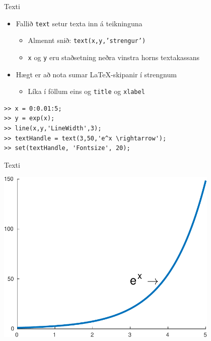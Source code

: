 \documentclass[handout]{beamer}
\begin{document}
\begin{frame}[fragile]{Texti}
\begin{itemize}
 \item Fallið \texttt{text} setur texta inn á teikninguna
 \begin{itemize}
  \item Almennt snið: \texttt{text(x,y,'strengur')}
  \item \texttt{x} og \texttt{y} eru staðsetning neðra vinstra horns textakassans
 \end{itemize}
 \item Hægt er að nota sumar \LaTeX-skipanir í strengnum
 \begin{itemize}
  \item Líka í föllum eins og \texttt{title} og \texttt{xlabel}
 \end{itemize}
\end{itemize}

\begin{verbatim}
>> x = 0:0.01:5;
>> y = exp(x);
>> line(x,y,'LineWidth',3);
>> textHandle = text(3,50,'e^x \rightarrow');
>> set(textHandle, 'Fontsize', 20);
\end{verbatim}

\end{frame}

\begin{frame}{Texti}
\begin{center}
\includegraphics[width=0.8\textwidth]{Pics/exp-label}
\end{center}
\end{frame}
\end{document}
